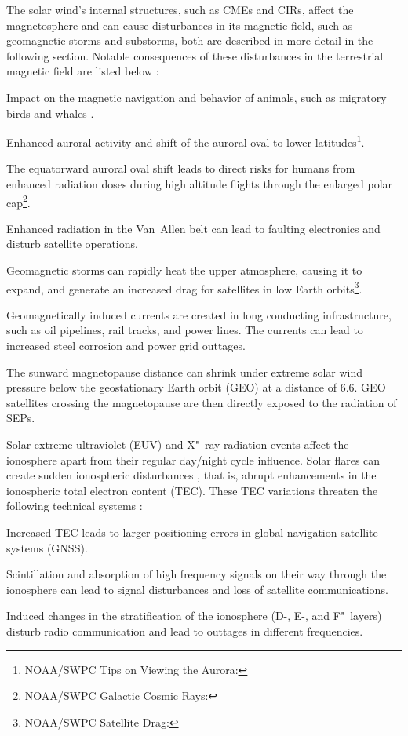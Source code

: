 The solar wind's internal structures, such as CMEs and CIRs, affect the magnetosphere and can cause disturbances in its magnetic field, such as geomagnetic storms and substorms, both are described in more detail in the following section. Notable consequences of these disturbances in the terrestrial magnetic field are listed below \citep{Bothmer2007}:
\begin{itemize*}
	\item Impact on the magnetic navigation and behavior of animals, such as migratory birds \citep{Moore1977} and whales \citep{Vanselow2017}.
	\item Enhanced auroral activity and shift of the auroral oval to lower latitudes\footnote{NOAA/SWPC Tips on Viewing the Aurora: }.
	\item The equatorward auroral oval shift leads to direct risks for humans from enhanced radiation doses during high altitude flights through the enlarged polar cap\footnote{NOAA/SWPC Galactic Cosmic Rays: }.
	\item Enhanced radiation in the Van~Allen belt can lead to faulting electronics and disturb satellite operations.
	\item Geomagnetic storms can rapidly heat the upper atmosphere, causing it to expand, and generate an increased drag for satellites in low Earth orbits\footnote{NOAA/SWPC Satellite Drag: }.
	\item Geomagnetically induced currents are created in long conducting infrastructure, such as oil pipelines, rail tracks, and power lines. The currents can lead to increased steel corrosion and power grid outtages.
	\item The sunward magnetopause distance can shrink under extreme solar wind pressure below the geostationary Earth orbit (GEO) at a distance of \SI{6.6}{\RE}. GEO satellites crossing the magnetopause are then directly exposed to the radiation of SEPs.
\end{itemize*}

Solar extreme ultraviolet (EUV) and X"~ray radiation events affect the ionosphere apart from their regular day/night cycle influence. Solar flares can create sudden ionospheric disturbances \citep{Gosling1993}, that is, abrupt enhancements in the ionospheric total electron content (TEC). These TEC variations threaten the following technical systems \citep{Kraaikamp2015}:
\begin{itemize*}
	\item Increased TEC leads to larger positioning errors in global navigation satellite systems (GNSS).
	\item Scintillation and absorption of high frequency signals on their way through the ionosphere can lead to signal disturbances and loss of satellite communications.
	\item Induced changes in the stratification of the ionosphere (D-, E-, and F"~layers) disturb radio communication and lead to outtages in different frequencies.
\end{itemize*}

